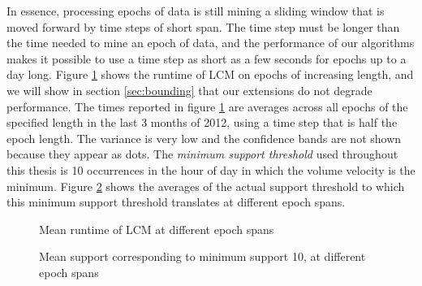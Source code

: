 \documentclass[letterpaper,12pt,titlepage,oneside,final]{book}
\begin{document}
In essence, processing epochs of data is still 
mining a sliding window that is moved forward by time steps of short span.
The time step must be longer than the time needed to mine an epoch of data,
and the performance of our algorithms makes it possible to use a time step
as short as a few seconds for epochs up to a day long.
Figure \ref{fig:runtimeEpochs} shows the runtime of LCM on epochs of
increasing length, and we will show in section \ref{sec:bounding} that our
extensions do not degrade performance.
The times reported in figure \ref{fig:runtimeEpochs} are averages across all
epochs of the specified length in the last 3 months of 2012, %
using a time step that is half the epoch length.
The variance is very low and the confidence bands are not shown because they
appear as dots.  %
The \emph{minimum support threshold} used throughout this thesis %
is 10 occurrences in the hour of day in which the volume velocity is the minimum. %
Figure \ref{fig:avgSupp} shows the averages of the actual support threshold to which this minimum support
threshold translates at different epoch spans.

\begin{figure}
\centering
{}
\caption{Mean runtime of LCM at different epoch spans}
\label{fig:runtimeEpochs}
\end{figure}


\begin{figure}
\centering
{}
\caption{Mean support corresponding to minimum support 10, at different epoch spans}
\label{fig:avgSupp}
\end{figure}
\end{document}
